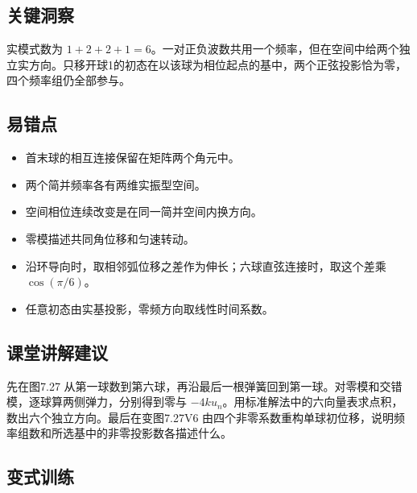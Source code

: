 \documentclass[UTF8,fontset=fandol,a4paper,11pt]{ctexart}
\begin{document}
\subsection*{关键洞察}

实模式数为 $1+2+2+1=6$。一对正负波数共用一个频率，但在空间中给两个独立实方向。只移开球1的初态在以该球为相位起点的基中，两个正弦投影恰为零，四个频率组仍全部参与。




\subsection*{易错点}

\begin{itemize}
\item 首末球的相互连接保留在矩阵两个角元中。
\item 两个简并频率各有两维实振型空间。
\item 空间相位连续改变是在同一简并空间内换方向。
\item 零模描述共同角位移和匀速转动。
\item 沿环导向时，取相邻弧位移之差作为伸长；六球直弦连接时，取这个差乘 $\cos(\pi/6)$。
\item 任意初态由实基投影，零频方向取线性时间系数。
\end{itemize}




\subsection*{课堂讲解建议}

先在图7.27 从第一球数到第六球，再沿最后一根弹簧回到第一球。对零模和交错模，逐球算两侧弹力，分别得到零与 $-4ku_n$。用标准解法中的六向量表求点积，数出六个独立方向。最后在变图7.27V6 由四个非零系数重构单球初位移，说明频率组数和所选基中的非零投影数各描述什么。




\subsection*{变式训练}
\end{document}
